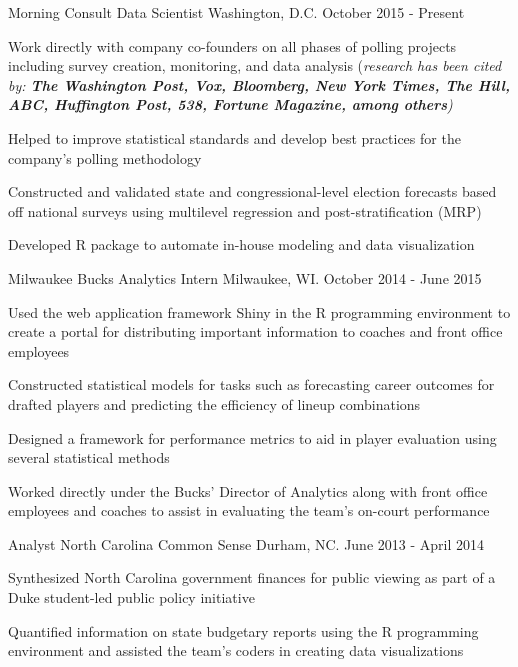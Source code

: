\documentclass[11pt, a4paper]{awesome-cv}
\begin{document}
\begin{cventries}
  \cventry
    {Morning Consult}
    {Data Scientist}
    {Washington, D.C.}
    {October 2015 - Present}
    {
      \begin{cvitems}
        \item{Work directly with company co-founders on all phases of polling projects including survey creation,
        monitoring, and data analysis (\textit{research has been cited by: \textbf{The Washington Post, Vox, Bloomberg, New York Times, The Hill, ABC, Huffington Post, 538, Fortune Magazine, among others})}}
        \item{Helped to improve statistical standards and develop best practices for the company’s polling methodology}
        \item{Constructed and validated state and congressional-level election forecasts based off national surveys using multilevel regression and post-stratification (MRP)}
        \item{Developed R package to automate in-house modeling and data visualization}
      \end{cvitems}
    }
  \cventry
    {Milwaukee Bucks}
    {Analytics Intern}
    {Milwaukee, WI.}
    {October 2014 - June 2015}
    {
      \begin{cvitems}
        \item{Used the web application framework Shiny in the R programming environment to create a portal for distributing important information to coaches and front office employees}
        \item{Constructed statistical models for tasks such as forecasting career outcomes for drafted players
and predicting the efficiency of lineup combinations}
         \item{Designed a framework for performance metrics to aid in player evaluation using several statistical
methods}
        \item{Worked directly under the Bucks’ Director of Analytics along with front office employees and
coaches to assist in evaluating the team’s on-court performance}
      \end{cvitems}
    }
  \cventry
    {Analyst}
    {North Carolina Common Sense}
    {Durham, NC.}
    {June 2013 - April 2014}
    {
      \begin{cvitems}
        \item{Synthesized North Carolina government finances for public viewing as part of a Duke student-led
public policy initiative}
        \item{Quantified information on state budgetary reports using the R programming environment and
assisted the team’s coders in creating data visualizations}
      \end{cvitems} 
    }
    

\end{cventries}
\end{document}
